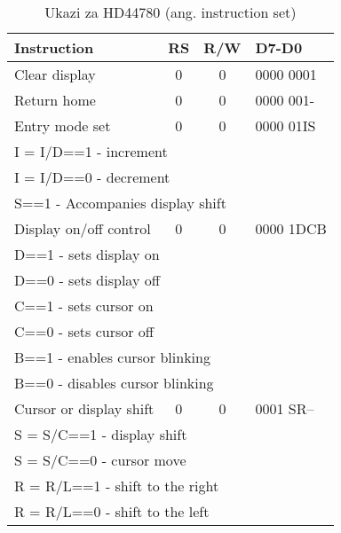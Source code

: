 \documentclass[12pt,a4paper,twoside,openright,slovene]{book}
\begin{document}
\begin{footnotesize}
	\begin{center}
        \begin{longtable}{lccl}
            \caption{Ukazi za HD44780 (ang. instruction set)}
            \label{instruction_set_HD44780} \\
            Instruction                                 & RS    & R/W   & D7-D0     \\ \hline \hline
            Clear display                               & 0     & 0     & 0000 0001 \\ \hline
            Return home                                 & 0     & 0     & 0000 001- \\ \hline
            Entry mode set                              & 0     & 0     & 0000 01IS \\
                  \multicolumn{3}{l}{\quad I = I/D==1 - increment } \\
                  \multicolumn{3}{l}{\quad I = I/D==0 - decrement} \\
                  \multicolumn{3}{l}{\quad S==1 - Accompanies display shift} \\ \hline
            Display on/off control                      & 0     & 0     & 0000 1DCB \\
                  \multicolumn{3}{l}{\quad D==1 - sets display on} \\
                  \multicolumn{3}{l}{\quad D==0 - sets display off} \\
                  \multicolumn{3}{l}{\quad C==1 - sets cursor on }\\
                  \multicolumn{3}{l}{\quad C==0 - sets cursor off }\\
                  \multicolumn{3}{l}{\quad B==1 - enables cursor blinking }\\
                  \multicolumn{3}{l}{\quad B==0 - disables cursor blinking} \\ \hline
            Cursor or display shift                     & 0     & 0     &   0001 SR-- \\
                  \multicolumn{3}{l}{\quad S = S/C==1 - display shift} \\
                  \multicolumn{3}{l}{\quad S = S/C==0 - cursor move} \\
                  \multicolumn{3}{l}{\quad R = R/L==1 - shift to the right} \\
                  \multicolumn{3}{l}{\quad R = R/L==0 - shift to the left} \\ \hline

\end{longtable}
\end{center}
\end{footnotesize}
\end{document}
